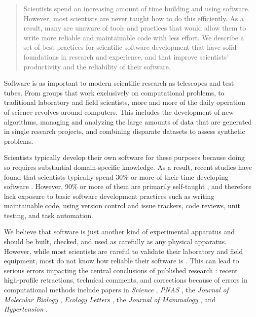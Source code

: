 \documentclass{pnastwo}
\begin{document}
\begin{article}

\begin{abstract}
Scientists spend an increasing amount of time building and using
software. However, most scientists are never taught how to do this
efficiently. As a result, many are unaware of tools and practices that
would allow them to write more reliable and maintainable code with
less effort. We describe a set of best practices for scientific
software development that have solid foundations in research and
experience, and that improve scientists' productivity and the
reliability of their software.
\end{abstract}

Software is as important to modern scientific research as telescopes and test
tubes. From groups that work exclusively on computational problems, to
traditional laboratory and field scientists, more and more of the daily
operation of science revolves around computers. This includes the development
of new algorithms, managing and analyzing the large amounts of data that are
generated in single research projects, and combining disparate
datasets to assess synthetic problems.

Scientists typically develop their own software for these purposes
because doing so requires substantial domain-specific knowledge. As a
result, recent studies have found that scientists typically spend 30\%
or more of their time developing software
\cite{hannay2008,prabhu2011}.  However, 90\% or more of them are
primarily self-taught \cite{hannay2008,prabhu2011}, and therefore lack
exposure to basic software development practices such as writing
maintainable code, using version control and issue trackers, code
reviews, unit testing, and task automation.

We believe that software is just another kind of experimental
apparatus \cite{vardi2010} and should be built, checked, and used as
carefully as any physical apparatus.  However, while most scientists
are careful to validate their laboratory and field equipment, most do
not know how reliable their software is
\cite{hatton1994,hatton1997}. This can lead to serious errors
impacting the central conclusions of published research
\cite{merali2010}: recent high-profile retractions, technical
comments, and corrections because of errors in computational methods
include papers in \emph{Science} \cite{chang2006}, \emph{PNAS}
\cite{ma2007}, the \emph{Journal of Molecular Biology}
\cite{chang2007}, \emph{Ecology Letters} \cite{lees2007,currie2007},
the \emph{Journal of Mammalogy} \cite{kelt2008}, and
\emph{Hypertension} \cite{hypertension2012}.


\end{article}
\end{document}
